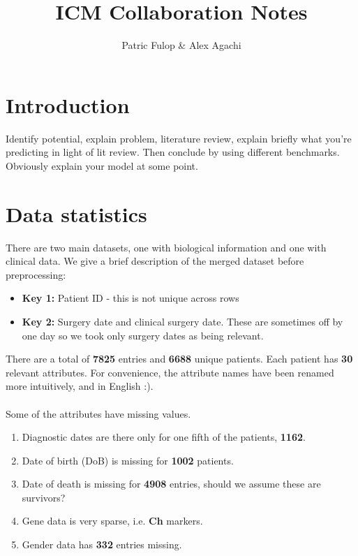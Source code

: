 \documentclass[a4paper]{article}
\title{ICM Collaboration Notes}
\author{Patric Fulop \& Alex Agachi}
\affil{The University of Edinburgh}
\begin{document}
\maketitle


\section{Introduction}
Identify potential, explain problem, literature review, explain briefly what you're predicting in light of lit review. Then conclude by using different benchmarks. Obviously explain your model at some point. 
\section{Data statistics}
There are two main datasets, one with biological information and one with clinical data. 
We give a brief description of the merged dataset before preprocessing:
%
\begin{itemize}
\item \textbf{Key 1:} Patient ID - this is not unique across rows
\item \textbf{Key 2:} Surgery date and clinical surgery date. 
These are sometimes off by one day so we took only surgery dates as being relevant.
\end{itemize}
%
There are a total of \textbf{7825} entries and \textbf{6688} unique patients. Each patient has \textbf{30} relevant attributes. For convenience, the attribute names have been renamed more intuitively, and in English :). \\
\\
Some of the attributes have missing values.
\begin{enumerate}
\item Diagnostic dates are there only for one fifth of the patients,  \textbf{1162}.
\item Date of birth (DoB) is missing for \textbf{1002} patients.
\item Date of death is missing for \textbf{4908} entries, should we assume these are survivors? 
\item Gene data is very sparse, i.e. \textbf{Ch} markers.
\item Gender data has \textbf{332} entries missing.
\end{enumerate}
\end{document}
